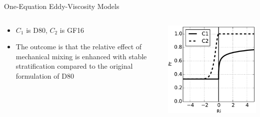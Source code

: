 \begin{frame}{One-Equation Eddy-Viscosity Models}
  
\setlength{\fboxsep}{0pt}
\setlength{\fboxrule}{1pt}
\begin{columns}[T]
    \begin{column}{.45\textwidth}
    \begin{itemize}
    	\item $C_1$ is D80, $C_2$ is GF16
    	\item The outcome is that the relative effect of mechanical mixing is enhanced with stable stratification compared to the original formulation of D80
    \end{itemize}
    \end{column}
    \begin{column}{.55\textwidth}
    \begin{minipage}[c][.6\textheight][c]{\linewidth}
      \includegraphics[width=\textwidth]{prandtl.pdf}
      \end{minipage}
    \end{column}
  \end{columns}
  
\end{frame}


